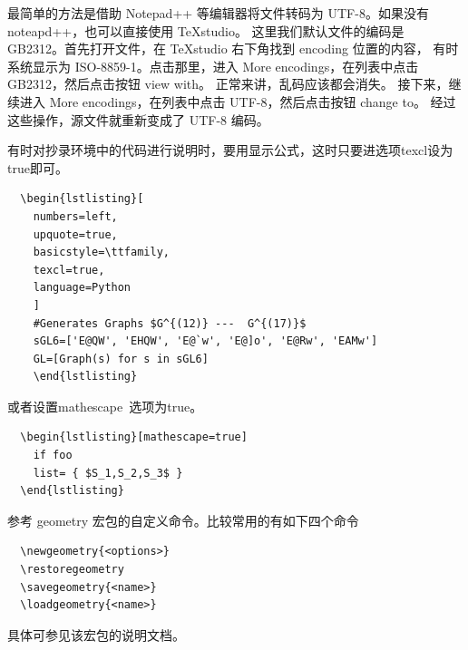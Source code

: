 
最简单的方法是借助 Notepad++ 等编辑器将文件转码为 UTF-8。如果没有 noteapd++，也可以直接使用 TeXstudio。
这里我们默认文件的编码是 GB2312。首先打开文件，在 TeXstudio 右下角找到 encoding 位置的内容，
有时系统显示为 ISO-8859-1。点击那里，进入 More encodings，在列表中点击 GB2312，然后点击按钮 view with。
正常来讲，乱码应该都会消失。 接下来，继续进入 More encodings，在列表中点击 UTF-8，然后点击按钮 change to。
经过这些操作，源文件就重新变成了 UTF-8 编码。



有时对抄录环境中的代码进行说明时，要用显示公式，这时只要进选项texcl设为true即可。

\begin{verbatim}
  \begin{lstlisting}[
    numbers=left,
    upquote=true,
    basicstyle=\ttfamily,
    texcl=true,
    language=Python
    ]
    #Generates Graphs $G^{(12)} ---  G^{(17)}$
    sGL6=['E@QW', 'EHQW', 'E@`w', 'E@]o', 'E@Rw', 'EAMw']
    GL=[Graph(s) for s in sGL6]
    \end{lstlisting}
\end{verbatim}
%  
%  

或者设置mathescape~选项为true。

\begin{verbatim}
  \begin{lstlisting}[mathescape=true]
    if foo
    list= { $S_1,S_2,S_3$ }
  \end{lstlisting}
\end{verbatim}





参考 geometry 宏包的自定义命令。比较常用的有如下四个命令
\begin{verbatim}
  \newgeometry{<options>}
  \restoregeometry
  \savegeometry{<name>}
  \loadgeometry{<name>}
\end{verbatim}
具体可参见该宏包的说明文档。


